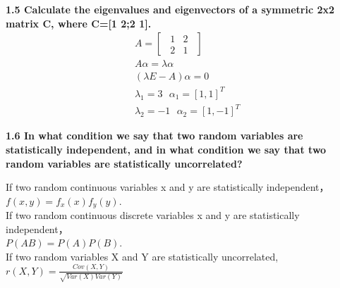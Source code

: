 \noindent \textbf{1.5 Calculate the eigenvalues and eigenvectors of a symmetric 2x2 matrix C, where C=[1 2;2 1].}
\begin{align}
&A=\begin{bmatrix}
     ~~1 & 2~~ \\
     ~~2 & 1~~
   \end{bmatrix}\nonumber\\
&A\alpha=\lambda\alpha\nonumber\\
&(\lambda E-A)\alpha=0 \nonumber\\
&\lambda_1=3 ~~~\alpha_1=  [1,1]^T \nonumber\\
&\lambda_2=-1 ~~~\alpha_2=  [1,-1]^T \nonumber
\end{align}

\noindent\textbf{1.6 In what condition we say that two random variables are statistically independent, and in what condition we say that two random variables are statistically uncorrelated?}

\noindent If two random continuous variables x and y are statistically independent，\\
$f(x,y)=f_x(x)f_y(y)$.\\
If two random continuous discrete variables x and y are statistically independent，\\
$P(AB)=P(A)P(B)$.\\
If two random variables X and Y are statistically uncorrelated,\\
$r(X,Y)=\frac{Cov(X,Y)}{\sqrt{Var(X)Var(Y)}}$




\newpage
